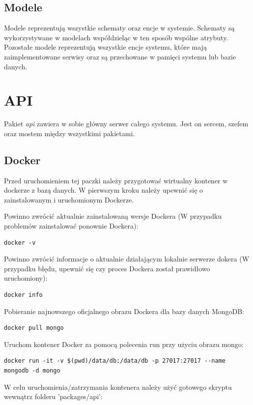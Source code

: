 \subsection{Modele}
Modele reprezentują wszystkie schematy oraz encje w systemie.
Schematy są wykorzystywane w modelach współdzieląc w ten sposób wspólne atrybuty. Pozostałe modele reprezentują wszystkie encje systemu, które mają zaimplementowane serwisy oraz są przechowane w pamięci systemu lub bazie danych.

\section{API}
Pakiet \textit{api} zawiera w sobie główny serwer całego systemu. Jest on sercem, szefem oraz mostem między wszystkimi pakietami.

\subsection{Docker}
Przed uruchomieniem tej paczki należy przygotować wirtualny kontener w dockerze z bazą danych. W pierwszym kroku należy upewnić się o zainstalowanym i uruchomionym Dockerze.

Powinno zwrócić aktualnie zainstalowaną wersje Dockera (W przypadku problemów zainstalować ponownie Dockera):
\begin{lstlisting}
docker -v
\end{lstlisting}

Powinno zwrócić informacje o aktualnie działającym lokalnie serwerze dokera (W przypadku błędu, upewnić się czy proces Dockera został prawidłowo uruchomiony):
\begin{lstlisting}
docker info
\end{lstlisting}

Pobieranie najnowszego oficjalnego obrazu Dockera dla bazy danych MongoDB:

\begin{lstlisting}
docker pull mongo
\end{lstlisting}

Uruchom kontener Docker za pomocą polecenia run przy użyciu obrazu mongo:

\begin{lstlisting}[breaklines=true]
docker run -it -v $(pwd)/data/db:/data/db -p 27017:27017 --name mongodb -d mongo
\end{lstlisting}

W celu uruchomienia/zatrzymania kontenera należy użyć gotowego skryptu wewnątrz folderu 'packages/api':

